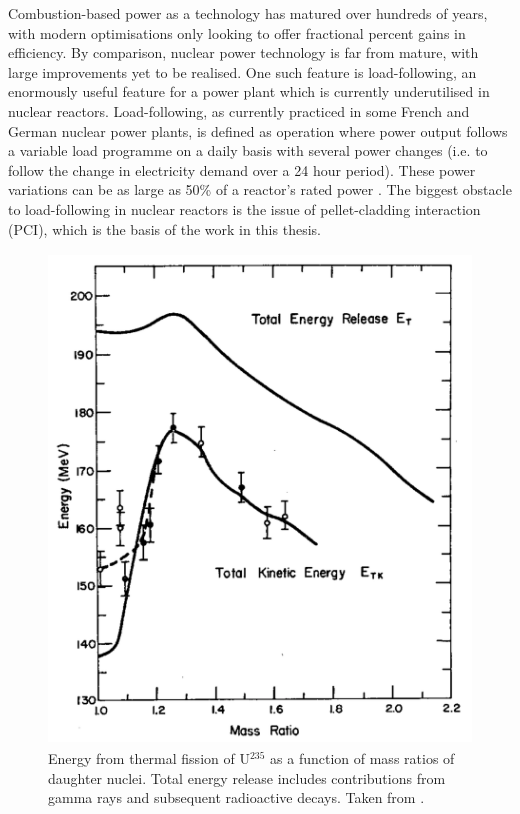 Combustion-based power as a technology has matured over hundreds of years, with modern optimisations only looking to offer fractional percent gains in efficiency. By comparison, nuclear power technology is far from mature, with large improvements yet to be realised. One such feature is load-following, an enormously useful feature for a power plant which is currently underutilised in nuclear reactors. Load-following, as currently practiced in some French and German nuclear power plants, is defined as operation where power output follows a variable load programme on a daily basis with several power changes (i.e. to follow the change in electricity demand over a 24 hour period). These power variations can be as large as 50\% of a reactor's rated power \cite{lokhov2011technical}. The biggest obstacle to load-following in nuclear reactors is the issue of pellet-cladding interaction (PCI), which is the basis of the work in this thesis.

\begin{figure}[ht]
\centering
\includegraphics[height=13cm]{images/fission_energy_total.png}
\caption[Energy from thermal fission of U$^{235}$ as a function of mass ratios of daughter nuclei. Total energy release includes contributions from gamma rays and subsequent radioactive decays.]{Energy from thermal fission of U$^{235}$ as a function of mass ratios of daughter nuclei. Total energy release includes contributions from gamma rays and subsequent radioactive decays. Taken from \cite{aras1965ranges}.}
\label{figure:fissionenergy}
\end{figure}

